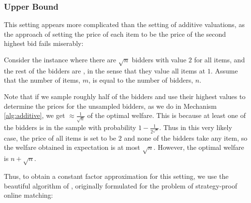 \subsubsection{Upper Bound}
This setting appears more complicated than the setting of additive valuations, as the approach of setting the price of each item to be the price of the second highest bid fails miserably:
\begin{example}\label{ex:ud-failure}
    Consider the instance where there are $\sqrt{n}$  bidders with value $2$ for all items, and the rest of the bidders are , in the sense that they value all items at $1$. Assume that the number of items, $m$, is equal to the number of bidders, $n$.
    
    Note that if we sample roughly half of the bidders and use their highest values to determine the prices for the unsampled bidders, as we
    do in Mechanism \ref{alg:additive},
    we get $\approx\frac{1}{\sqrt n}$ of the optimal welfare. This is because at least one of the  bidders is in the sample with probability $1-\frac{1}{2^{\sqrt n}}$. Thus in this very likely case, the price of all items is set to be $2$ and none of the  bidders take any item, so the welfare obtained in expectation is at most $\sqrt{n}$. However, the  optimal welfare is $n+\sqrt{n}$. 
\end{example}
Thus, to obtain a constant factor approximation for this setting,  we use the beautiful algorithm of \cite{reiffenhauser2019optimal}, originally formulated for the problem of strategy-proof online matching: 
